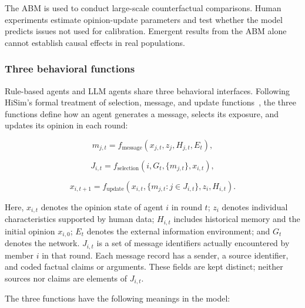 \documentclass[11pt,a4paper]{article}
\begin{document}
The ABM is used to conduct large-scale counterfactual comparisons. Human experiments estimate opinion-update parameters and test whether the model predicts issues not used for calibration. Emergent results from the ABM alone cannot establish causal effects in real populations.

\subsubsection{Three behavioral functions}

Rule-based agents and LLM agents share three behavioral interfaces. Following HiSim's formal treatment of selection, message, and update functions~\citep{mou2024}, the three functions define how an agent generates a message, selects its exposure, and updates its opinion in each round:

\begin{equation*}
m_{j,t}=f_{\text{message}}(x_{j,t},z_j,H_{j,t},E_t),
\end{equation*}

\begin{equation*}
J_{i,t}=f_{\text{selection}}(i,G_t,\{m_{j,t}\},x_{i,t}),
\end{equation*}

\begin{equation*}
x_{i,t+1}=f_{\text{update}}
\left(x_{i,t},\{m_{j,t}:j\in J_{i,t}\},z_i,H_{i,t}\right).
\end{equation*}

Here, $x_{i,t}$ denotes the opinion state of agent $i$ in round $t$; $z_i$ denotes individual characteristics supported by human data; $H_{i,t}$ includes historical memory and the initial opinion $x_{i,0}$; $E_t$ denotes the external information environment; and $G_t$ denotes the network. $J_{i,t}$ is a set of message identifiers actually encountered by member $i$ in that round. Each message record has a sender, a source identifier, and coded factual claims or arguments. These fields are kept distinct; neither sources nor claims are elements of $J_{i,t}$.

The three functions have the following meanings in the model:
\end{document}
